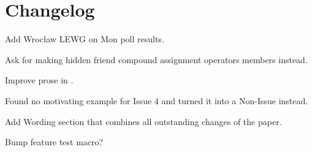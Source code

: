 \section{Changelog}
\begin{revision}
\item Add Wrocław LEWG on Mon poll results.
\item Ask for making hidden friend compound assignment operators members instead.
\end{revision}

\begin{revision}
\item Improve prose in .
\item Found no motivating example for Issue 4 and turned it into a Non-Issue instead.
\item Add Wording section that combines all outstanding changes of the paper.
\item Bump feature test macro?
\end{revision}
